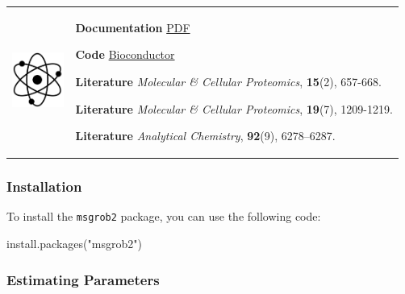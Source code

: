 \documentclass[
]{book}
\newenvironment{Shaded}{\begin{snugshade}}{\end{snugshade}}
\newcommand{\FunctionTok}[1]{\textcolor[rgb]{0.00,0.00,0.00}{#1}}
\newcommand{\NormalTok}[1]{#1}
\newcommand{\StringTok}[1]{\textcolor[rgb]{0.31,0.60,0.02}{#1}}
\begin{document}
\begin{longtable}[]{@{}
  >{\raggedright\arraybackslash}p{}
  >{\raggedright\arraybackslash}p{}@{}}
\toprule\noalign{}
\endhead
\bottomrule\noalign{}
\endlastfoot
\includegraphics[width=\textwidth,height=0.70833in]{images/05.png} & \textbf{Documentation} \textbar{} \href{https://www.bioconductor.org/packages/release/bioc/manuals/msqrob2/man/msqrob2.pdf}{PDF}

\textbf{Code} \textbar{} \href{https://www.bioconductor.org/packages/release/bioc/html/msqrob2.html}{Bioconductor}

\textbf{Literature} \textbar{} \emph{Molecular \& Cellular Proteomics}, \textbf{15}(2), 657-668.

\textbf{Literature} \textbar{} \emph{Molecular \& Cellular Proteomics}, \textbf{19}(7), 1209-1219.

\textbf{Literature} \textbar{} \emph{Analytical Chemistry}, \textbf{92}(9), 6278--6287. \\
\end{longtable}

\hfill\break

\hypertarget{installation-4}{%
\subsubsection*{Installation}\label{installation-4}}

To install the \texttt{msgrob2} package, you can use the following code:

\begin{Shaded}
\begin{Highlighting}[]
\FunctionTok{install.packages}\NormalTok{(}\StringTok{"msgrob2"}\NormalTok{)}
\end{Highlighting}
\end{Shaded}

\hypertarget{estimating-parameters}{%
\subsubsection*{Estimating Parameters}\label{estimating-parameters}}
\end{document}
